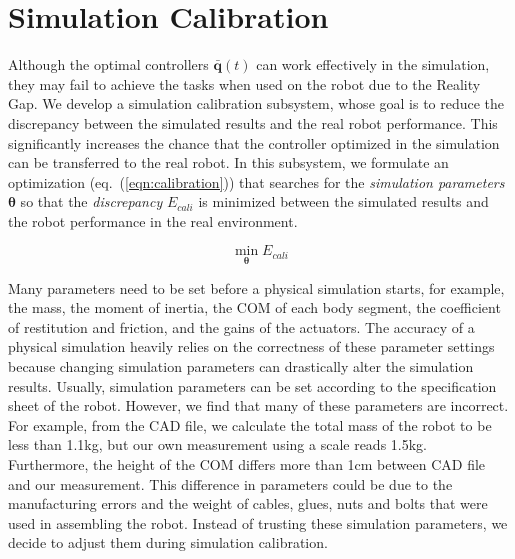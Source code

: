 \section{Simulation Calibration}

Although the optimal controllers $\bar{\mathbf{q}}(t)$ can work effectively in the simulation, they may fail to achieve the tasks when used on the robot due to the Reality Gap. We develop a simulation calibration subsystem, whose goal is to reduce the discrepancy between the simulated results and the real robot performance. This significantly increases the chance that the controller optimized in the simulation can be transferred to the real robot. In this subsystem, we formulate an optimization (eq.~(\ref{eqn:calibration})) that searches for the \emph{simulation parameters} $\mathbf{\theta}$ so that the \emph{discrepancy} $E_{cali}$ is minimized between the simulated results and the robot performance in the real environment.

\begin{equation}
 \min_{\mathbf{\theta}} E_{cali}
\label{eqn:calibration}
\end{equation}

Many parameters need to be set before a physical simulation starts, for example, the mass, the moment of inertia, the COM of each body segment, the coefficient of restitution and friction, and the gains of the actuators. The accuracy of a physical simulation heavily relies on the correctness of these parameter settings because changing simulation parameters can drastically alter the simulation results. Usually, simulation parameters can be set according to the specification sheet of the robot. However, we find that many of these parameters are incorrect. For example, from the CAD file, we calculate the total mass of the robot to be less than 1.1kg, but our own measurement using a scale reads 1.5kg. Furthermore, the height of the COM differs more than 1cm between CAD file and our measurement. This difference in parameters could be due to the manufacturing errors and the weight of cables, glues, nuts and bolts that were used in assembling the robot. Instead of trusting these simulation parameters, we decide to adjust them during simulation calibration.

